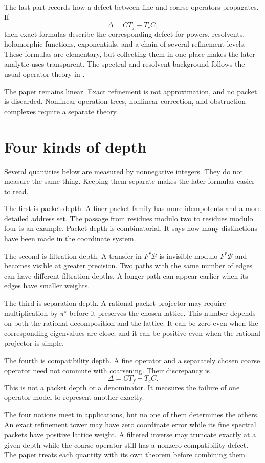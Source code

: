 \documentclass[11pt,a4paper]{article}
\theoremstyle{definition}
\theoremstyle{remark}
\newcommand{\Bcal}{\mathcal B}
\theoremstyle{definition}\newtheorem{construction}[theorem]{Construction}\newtheorem{certificate}[theorem]{Numerical Certificate}
\theoremstyle{remark}\newtheorem{boundary}[theorem]{Boundary}
\begin{document}
The last part records how a defect between fine and coarse operators propagates.  If
\[
\Delta=CT_f-T_cC,
\]
then exact formulas describe the corresponding defect for powers, resolvents, holomorphic functions, exponentials, and a chain of several refinement levels.  These formulas are elementary, but collecting them in one place makes the later analytic uses transparent.  The spectral and resolvent background follows the usual operator theory in \cite{Kato1995}.

The paper remains linear.  Exact refinement is not approximation, and no packet is discarded.  Nonlinear operation trees, nonlinear correction, and obstruction complexes require a separate theory.

\section{Four kinds of depth}\label{sec:four_depths}

Several quantities below are measured by nonnegative integers.  They do not measure the same thing.  Keeping them separate makes the later formulas easier to read.

The first is packet depth.  A finer packet family has more idempotents and a more detailed address set.  The passage from residues modulo two to residues modulo four is an example.  Packet depth is combinatorial.  It says how many distinctions have been made in the coordinate system.

The second is filtration depth.  A transfer in $F^r\Bcal$ is invisible modulo $F^r\Bcal$ and becomes visible at greater precision.  Two paths with the same number of edges can have different filtration depths.  A longer path can appear earlier when its edges have smaller weights.

The third is separation depth.  A rational packet projector may require multiplication by $\pi^s$ before it preserves the chosen lattice.  This number depends on both the rational decomposition and the lattice.  It can be zero even when the corresponding eigenvalues are close, and it can be positive even when the rational projector is simple.

The fourth is compatibility depth.  A fine operator and a separately chosen coarse operator need not commute with coarsening.  Their discrepancy is
\[
\Delta=CT_f-T_cC.
\]
This is not a packet depth or a denominator.  It measures the failure of one operator model to represent another exactly.

The four notions meet in applications, but no one of them determines the others.  An exact refinement tower may have zero coordinate error while its fine spectral packets have positive lattice weight.  A filtered inverse may truncate exactly at a given depth while the coarse operator still has a nonzero compatibility defect.  The paper treats each quantity with its own theorem before combining them.
\end{document}
